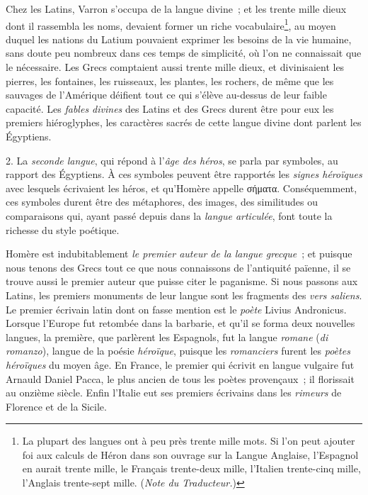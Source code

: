 \documentclass[french,twoside]{book} %
\begin{document}
Chez les Latins, Varron s’occupa de la langue divine ; et les trente mille dieux dont il rassembla les noms, devaient former un riche vocabulaire\footnote{La plupart des langues ont à peu près trente mille mots. Si l’on peut ajouter foi aux calculs de Héron dans son ouvrage sur la Langue Anglaise, l’Espagnol en aurait trente mille, le Français trente-deux mille, l’Italien trente-cinq mille, l’Anglais trente-sept mille. ({\itshape Note du Traducteur.})}, au moyen duquel les nations du Latium pouvaient exprimer les besoins de la vie humaine, sans doute peu nombreux dans ces temps de simplicité, où l’on ne connaissait que le nécessaire. Les Grecs comptaient aussi trente mille dieux, et divinisaient les pierres, les fontaines, les ruisseaux, les plantes, les rochers, de même que les sauvages de l’Amérique déifient tout ce qui s’élève au-dessus de leur faible capacité. Les {\itshape fables divines} des Latins et des Grecs durent être pour eux les premiers hiéroglyphes, les caractères sacrés de cette langue divine dont parlent les Égyptiens.\par
2. La {\itshape seconde langue}, qui répond à l’{\itshape âge des héros}, se parla par symboles, au rapport des Égyptiens. À ces symboles peuvent être rapportés les {\itshape signes héroïques} avec lesquels écrivaient les héros, et qu’Homère appelle σήματα. Conséquemment, ces symboles durent être des métaphores, des images, des similitudes ou comparaisons qui, ayant passé  depuis dans la {\itshape langue articulée}, font toute la richesse du style poétique.\par
Homère est indubitablement {\itshape le premier auteur de la langue grecque} ; et puisque nous tenons des Grecs tout ce que nous connaissons de l’antiquité païenne, il se trouve aussi le premier auteur que puisse citer le paganisme. Si nous passons aux Latins, les premiers monuments de leur langue sont les fragments des {\itshape vers saliens}. Le premier écrivain latin dont on fasse mention est le {\itshape poète} Livius Andronicus. Lorsque l’Europe fut retombée dans la barbarie, et qu’il se forma deux nouvelles langues, la première, que parlèrent les Espagnols, fut la langue {\itshape romane} ({\itshape di romanzo}), langue de la poésie {\itshape héroïque}, puisque les {\itshape romanciers} furent les {\itshape poètes héroïques} du moyen âge. En France, le premier qui écrivit en langue vulgaire fut Arnauld Daniel Pacca, le plus ancien de tous les poètes provençaux ; il florissait au onzième siècle. Enfin l’Italie eut ses premiers écrivains dans les {\itshape rimeurs} de Florence et de la Sicile.\par
\end{document}
